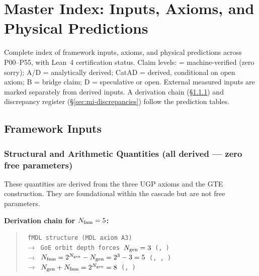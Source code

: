 
\clearpage
\section{Master Index: Inputs, Axioms, and Physical Predictions}
\label{app:master_index}

{\small
Complete index of framework inputs, axioms, and physical predictions across P00--P55,
with Lean~4 certification status. Claim levels: \CatAL{} = machine-verified (zero sorry);
A/D = analytically derived; CatAD = derived, conditional on open axiom; B = bridge claim;
D = speculative or open. External measured inputs are marked separately from derived inputs.
A derivation chain (\S\ref{sec:mi-structural-inputs}) and discrepancy register
(\S\ref{sec:mi-discrepancies}) follow the prediction tables.}

\subsection{Framework Inputs}
\label{sec:mi-inputs}

\subsubsection{Structural and Arithmetic Quantities (all derived — zero free parameters)}
\label{sec:mi-structural-inputs}

These quantities are derived from the three UGP axioms and the GTE construction.
They are foundational within the cascade but are not free parameters.

\medskip
\noindent\textbf{Derivation chain for $N_{\rm fam} = 5$:}
\begin{quote}\small\texttt{%
fMDL structure (MDL axiom A3)\\
$\;\to$ GoE orbit depth forces $N_{\rm gen} = 3$
  (, \CatAL)\\
$\;\to$ $N_{\rm fam} = 2^{N_{\rm gen}} - N_{\rm gen} = 2^3 - 3 = 5$
  (, , \CatAL)\\
$\;\to$ $N_{\rm gen} + N_{\rm fam} = 2^{N_{\rm gen}} = 8$
  (, \CatAL)}
\end{quote}

